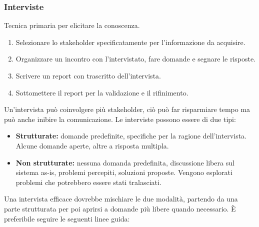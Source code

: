 \documentclass[../main.tex]{subfiles}
\begin{document}
\subsubsection{Interviste}
Tecnica primaria per elicitare la conoscenza.
\begin{enumerate}
	\item Selezionare lo stakeholder specificatamente per l'informazione da acquisire.
	\item Organizzare un incontro con l'intervistato, fare domande e segnare le risposte.
	\item Scrivere un report con trascritto dell'intervista.
	\item Sottomettere il report per la validazione e il rifinimento.
\end{enumerate}
Un'intervista può coinvolgere più stakeholder, ciò può far risparmiare tempo ma può anche inibire la comunicazione.
Le interviste possono essere di due tipi:
\begin{itemize}
	\item \textbf{Strutturate:} domande predefinite, specifiche per la ragione dell'intervista. Alcune domande aperte, altre a risposta multipla. 
	\item \textbf{Non strutturate:} nessuna domanda predefinita, discussione libera sul sistema as-is, problemi percepiti, soluzioni proposte. Vengono esplorati problemi che potrebbero essere stati tralasciati.
\end{itemize}
Una intervista efficace dovrebbe mischiare le due modalità, partendo da una parte strutturata per poi aprirsi a domande più libere quando necessario.
È preferibile seguire le seguenti linee guida:
\end{document}

